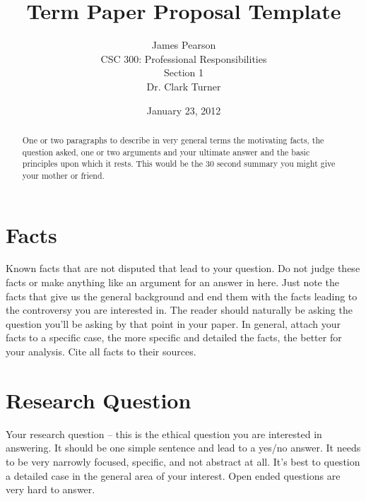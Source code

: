 \documentclass[12pt]{article}
\begin{document}
\title{\vfill Term Paper Proposal Template} %
\author{
James Pearson \vspace{10pt} \\
CSC 300: Professional Responsibilities  \vspace{10pt} \\
Section 1 \vspace{10pt} \\
Dr. Clark Turner \vspace{10pt} \\
}
\date{January 23, 2012} %

\maketitle

\vfill  %
\begin{abstract}
One or two paragraphs to describe in very general terms the motivating facts, the question asked, one or two arguments and your ultimate answer and the basic principles upon which it rests. This would be the 30 second summary you might give your mother or friend. \cite{handout}
\end{abstract}

\thispagestyle{empty} %
\newpage

\section{Facts}
Known facts that are not disputed that lead to your question. Do not judge these facts or make anything like an argument for an answer in here. Just note the facts that give us the general background and end them with the facts leading to the controversy you are interested in. The reader should naturally be asking the question you'll be asking by that point in your paper. In general, attach your facts to a specific case, the more specific and detailed the facts, the better for your analysis. Cite all facts to their sources. \cite{handout}

\section{Research Question}
Your research question -- this is the ethical question you are interested in answering. It should be one simple sentence and lead to a yes/no answer. It needs to be very narrowly focused, specific, and not abstract at all. It's best to question a detailed case in the general area of your interest. Open ended questions are very hard to answer. \cite{handout}
\end{document}
